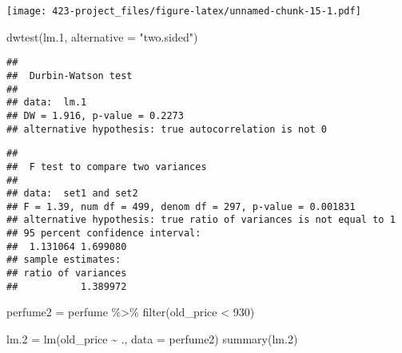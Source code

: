 \documentclass[
]{article}
\newenvironment{Shaded}{\begin{snugshade}}{\end{snugshade}}
\newcommand{\AttributeTok}[1]{\textcolor[rgb]{0.77,0.63,0.00}{#1}}
\newcommand{\DecValTok}[1]{\textcolor[rgb]{0.00,0.00,0.81}{#1}}
\newcommand{\FloatTok}[1]{\textcolor[rgb]{0.00,0.00,0.81}{#1}}
\newcommand{\FunctionTok}[1]{\textcolor[rgb]{0.00,0.00,0.00}{#1}}
\newcommand{\NormalTok}[1]{#1}
\newcommand{\OtherTok}[1]{\textcolor[rgb]{0.56,0.35,0.01}{#1}}
\newcommand{\SpecialCharTok}[1]{\textcolor[rgb]{0.00,0.00,0.00}{#1}}
\newcommand{\StringTok}[1]{\textcolor[rgb]{0.31,0.60,0.02}{#1}}
\begin{document}
\texttt{[image: 423-project\_files/figure-latex/unnamed-chunk-15-1.pdf]}

\begin{Shaded}
\begin{Highlighting}[]
\FunctionTok{dwtest}\NormalTok{(lm}\FloatTok{.1}\NormalTok{, }\AttributeTok{alternative =} \StringTok{"two.sided"}\NormalTok{)}
\end{Highlighting}
\end{Shaded}

\begin{verbatim}
## 
##  Durbin-Watson test
## 
## data:  lm.1
## DW = 1.916, p-value = 0.2273
## alternative hypothesis: true autocorrelation is not 0
\end{verbatim}

\begin{Shaded}
\end{Shaded}

\begin{verbatim}
## 
##  F test to compare two variances
## 
## data:  set1 and set2
## F = 1.39, num df = 499, denom df = 297, p-value = 0.001831
## alternative hypothesis: true ratio of variances is not equal to 1
## 95 percent confidence interval:
##  1.131064 1.699080
## sample estimates:
## ratio of variances 
##           1.389972
\end{verbatim}

\begin{Shaded}
\begin{Highlighting}[]
\NormalTok{perfume2 }\OtherTok{=}\NormalTok{ perfume }\SpecialCharTok{\%\textgreater{}\%}
  \FunctionTok{filter}\NormalTok{(old\_price }\SpecialCharTok{\textless{}} \DecValTok{930}\NormalTok{)}
\end{Highlighting}
\end{Shaded}

\begin{Shaded}
\begin{Highlighting}[]
\NormalTok{lm}\FloatTok{.2} \OtherTok{=} \FunctionTok{lm}\NormalTok{(old\_price }\SpecialCharTok{\textasciitilde{}}\NormalTok{ ., }\AttributeTok{data =}\NormalTok{ perfume2)}
\FunctionTok{summary}\NormalTok{(lm}\FloatTok{.2}\NormalTok{)}
\end{Highlighting}
\end{Shaded}
\end{document}
